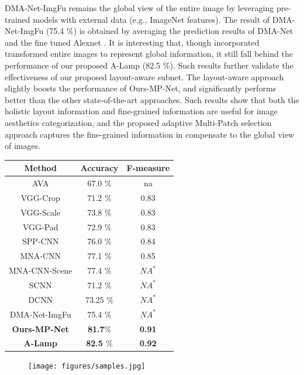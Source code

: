 \documentclass[10pt,twocolumn,letterpaper]{article}
\begin{document}
DMA-Net-ImgFu remains the global view of the entire image \cite{Lu:2015:ICCV} by leveraging pre-trained models with external data (e.g., ImageNet features). The result of DMA-Net-ImgFu (75.4 $\%$) is obtained by averaging the prediction results of DMA-Net and the fine tuned Alexnet \cite{Alex:2012:NIPS:ImageNet}. It is interesting that, though \cite{Lu:2015:ICCV} incorporated transformed entire images to represent global information, it still fall behind the performance of our proposed A-Lamp (82.5 $\%$). Such results further validate the effectiveness of our proposed layout-aware subnet. The layout-aware approach slightly boosts the performance of Ours-MP-Net, and significantly performs better than the other state-of-the-art approaches. Such results show that both the holistic layout information and fine-grained information are useful for image aesthetics categorization, and the proposed adaptive Multi-Patch selection approach captures the fine-grained information in compensate to the global view of images. 

\begin{center}
	\begin{tabular}{||c|c|c||} 
		\hline
		Method & Accuracy & F-measure\\
		\hline\hline
		AVA & 67.0 $\%$ & na  \\
		VGG-Crop & 71.2 $\%$ & 0.83 \\
		VGG-Scale & 73.8 $\%$ & 0.83 \\
		VGG-Pad & 72.9 $\%$ & 0.83 \\
		\hline
		SPP-CNN & 76.0 $\%$ & 0.84 \\
		MNA-CNN & 77.1 $\%$ & 0.85 \\
		MNA-CNN-Scene & 77.4 $\%$ & $N{A^ * }$ \\
		SCNN & 71.2 $\%$ & $N{A^ * }$ \\
		DCNN & 73.25 $\%$ & $N{A^ * }$ \\
		DMA-Net-ImgFu & 75.4 $\%$ & $N{A^ * }$\\
		\hline\hline
		\textbf{Ours-MP-Net} & \textbf{81.7$\% $} & \textbf{0.91} \\
		\textbf{A-Lamp} & \textbf{82.5 $\%$} & \textbf{0.92} \\
		\hline
	\end{tabular} \label{tabel2}
\end{center}

\begin{figure}
	\centering
	\texttt{[image: figures/samples.jpg]}
	\label{samples}
\end{figure}
\end{document}
